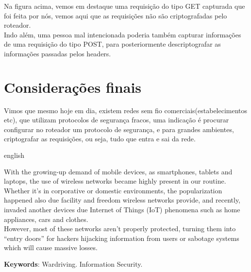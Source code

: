 \documentclass[
	article,			%
	12pt,				%
	oneside,			%
	a4paper,			%
	english,			%
	brazil,				%
	sumario=tradicional
	]{abntex2}
\begin{document}
Na figura acima, vemos em destaque uma requisição do tipo GET capturada que foi feita por nós, vemos aqui que as requisições não são criptografadas pelo roteador.\\

Indo além, uma pessoa mal intencionada poderia também capturar informações de uma requisição do tipo POST, para posteriormente descriptografar as informações passadas pelos headers.\\


\section*{Considerações finais}

Vimos que mesmo hoje em dia, existem redes sem fio comerciais(estabelecimentos etc), que utilizam protocolos de segurança fracos, uma indicação é procurar configurar no roteador um protocolo de segurança, e para grandes ambientes, criptografar as requisições, ou seja, tudo que entra e sai da rede.

\postextual

\emptythanks
\maketitle

\renewcommand{\resumoname}{Abstract}
\begin{resumoumacoluna}
 \begin{otherlanguage*}{english}

With the growing-up demand of mobile devices, as smartphones, tablets and laptops, the use of wireless networks became highly present in our routine. Whether it’s in corporative or domestic environments, the popularization happened also due facility and freedom wireless networks provide, and recently, invaded another devices due Internet of Things (IoT) phenomena such as home appliances, cars and clothes.\\

However, most of these networks aren’t properly protected, turning them into “entry doors” for hackers hijacking information from users or sabotage systems which will cause massive losses.

   \vspace{\onelineskip}

 \noindent
 \textbf{Keywords}: Wardriving. Information Security.
 \end{otherlanguage*}
\end{resumoumacoluna}


\end{document}
